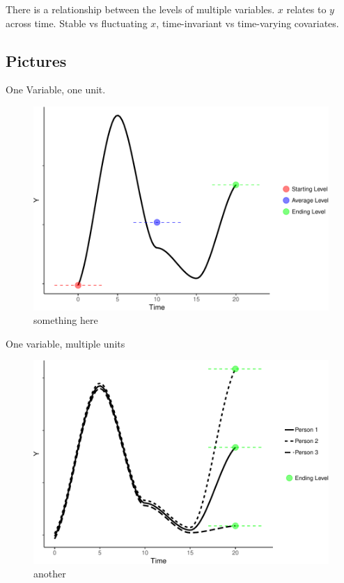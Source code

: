 \documentclass[english,,man]{apa6}
\theoremstyle{definition}
\theoremstyle{definition}
\theoremstyle{definition}
\theoremstyle{remark}
\begin{document}
There is a relationship between the levels of multiple variables. \(x\)
relates to \(y\) across time. Stable vs fluctuating \(x\),
time-invariant vs time-varying covariates.

\hypertarget{pictures}{%
\subsection{Pictures}\label{pictures}}

One Variable, one unit.

\begin{figure}
\centering
\includegraphics{figures/unnamed-chunk-7-1.pdf}
\caption{\label{fig:unnamed-chunk-7}something here\label{level}}
\end{figure}

One variable, multiple units

\begin{figure}
\centering
\includegraphics{figures/unnamed-chunk-8-1.pdf}
\caption{\label{fig:unnamed-chunk-8}another\label{level_var}}
\end{figure}
\end{document}
